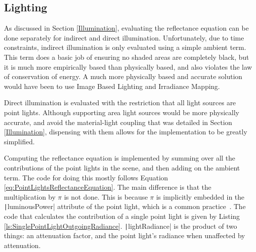 \vspace{-0.5cm}


\vspace{-0.2cm}

\subsection{Lighting} \label{PBRLighting}

As discussed in Section \ref{Illumination}, evaluating the reflectance equation can be done separately for indirect and direct illumination. Unfortunately, due to time constraints, indirect illumination is only evaluated using a simple ambient term. This term does a basic job of ensuring no shaded areas are completely black, but it is much more empirically based than physically based, and also violates the law of conservation of energy. A much more physically based and accurate solution would have been to use Image Based Lighting and Irradiance Mapping.

Direct illumination is evaluated with the restriction that all light sources are point lights. Although supporting area light sources would be more physically accurate, and avoid the material-light coupling that was detailed in Section \ref{Illumination}, dispensing with them allows for the implementation to be greatly simplified.

Computing the reflectance equation is implemented by summing over all the contributions of the point lights in the scene, and then adding on the ambient term. The code for doing this mostly follows Equation \ref{eq:PointLightsReflectanceEquation}. The main difference is that the multiplication by \begin{math}\pi\end{math} is not done. This is because \begin{math}\pi\end{math} is implicitly embedded in the \texttt|luminousPower| attribute of the point light, which is a common practice~\cite{LagardePi}. The code that calculates the contribution of a single point light is given by Listing \ref{ls:SinglePointLightOutgoingRadiance}. \texttt|lightRadiance| is the product of two things: an attenuation factor, and the point light's radiance when unaffected by attenuation.

